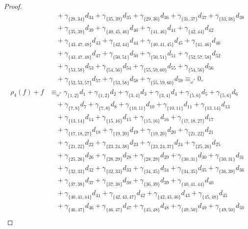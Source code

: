 \documentclass[reqno]{amsart}
\theoremstyle{plain}
\theoremstyle{definition}
\theoremstyle{plain}
\theoremstyle{definition}
\numberwithin{equation}{section}
\begin{document}
\begin{proof}
\begin{align*}
&\quad + \gamma_{\{28,34\}}d_{34} + \gamma_{\{35,39\}}d_{35} + \gamma_{\{29,36\}}d_{36} + \gamma_{\{31,37\}}d_{37} + \gamma_{\{33,38\}}d_{38}\\ 
&\quad + \gamma_{\{35,39\}}d_{39} + \gamma_{\{40,45,46\}}d_{40} + \gamma_{\{41,46\}}d_{41} + \gamma_{\{42,44\}}d_{42}\\ 
&\quad + \gamma_{\{43,47,48\}}d_{43} + \gamma_{\{42,44\}}d_{44} + \gamma_{\{40,41,45\}}d_{45} + \gamma_{\{41,46\}}d_{46}\\ 
&\quad + \gamma_{\{43,47,48\}}d_{47} + \gamma_{\{50,51\}}d_{50} + \gamma_{\{50,51\}}d_{51} + \gamma_{\{52,57,58\}}d_{52}\\ 
&\quad + \gamma_{\{53,58\}}d_{53} + \gamma_{\{54,56\}}d_{54} + \gamma_{\{55,59,60\}}d_{55} + \gamma_{\{54,56\}}d_{56}\\ 
&\quad + \gamma_{\{52,53,57\}}d_{57} + \gamma_{\{53,58\}}d_{58} + \gamma_{\{55,59,60\}}d_{59} \equiv_{\omega^*} 0,\\
\rho_4(f) + f &\equiv_{\omega^*} \gamma_{\{1,2\}}d_{1} + \gamma_{\{1,2\}}d_{2} + \gamma_{\{3,4\}}d_{3} + \gamma_{\{3,4\}}d_{4} + \gamma_{\{5,6\}}d_{5} + \gamma_{\{5,6\}}d_{6}\\ 
&\quad + \gamma_{\{7,8\}}d_{7} + \gamma_{\{7,8\}}d_{8} + \gamma_{\{10,11\}}d_{10} + \gamma_{\{10,11\}}d_{11} + \gamma_{\{13,14\}}d_{13}\\ 
&\quad + \gamma_{\{13,14\}}d_{14} + \gamma_{\{15,16\}}d_{15} + \gamma_{\{15,16\}}d_{16} + \gamma_{\{17,18,27\}}d_{17}\\ 
&\quad + \gamma_{\{17,18,27\}}d_{18} + \gamma_{\{19,20\}}d_{19} + \gamma_{\{19,20\}}d_{20} + \gamma_{\{21,22\}}d_{21}\\ 
&\quad + \gamma_{\{21,22\}}d_{22} + \gamma_{\{23,24,38\}}d_{23} + \gamma_{\{23,24,37\}}d_{24} + \gamma_{\{25,26\}}d_{25}\\ 
&\quad + \gamma_{\{25,26\}}d_{26} + \gamma_{\{28,29\}}d_{28} + \gamma_{\{28,29\}}d_{29} + \gamma_{\{30,31\}}d_{30} + \gamma_{\{30,31\}}d_{31}\\ 
&\quad + \gamma_{\{32,33\}}d_{32} + \gamma_{\{32,33\}}d_{33} + \gamma_{\{34,35\}}d_{34} + \gamma_{\{34,35\}}d_{35} + \gamma_{\{36,39\}}d_{36}\\ 
&\quad + \gamma_{\{37,38\}}d_{37} + \gamma_{\{37,38\}}d_{38} + \gamma_{\{36,39\}}d_{39} + \gamma_{\{40,41,44\}}d_{40}\\ 
&\quad + \gamma_{\{40,41,44\}}d_{41} + \gamma_{\{42,43,47\}}d_{42} + \gamma_{\{42,43,46\}}d_{43} + \gamma_{\{45,48\}}d_{45}\\ 
&\quad + \gamma_{\{46,47\}}d_{46} + \gamma_{\{46,47\}}d_{47} + \gamma_{\{45,48\}}d_{48} + \gamma_{\{49,50\}}d_{49} + \gamma_{\{49,50\}}d_{50}\\ 

\end{align*}
\end{proof}
\end{document}
